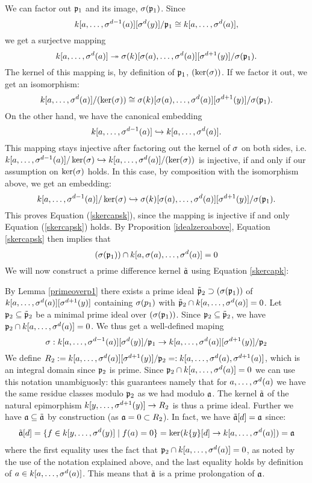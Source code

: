 \begin{prop}
\begin{bew}
We can factor out $\mathfrak{p}_1$ and its image, $\sigma(\mathfrak{p}_1)$. Since $$k[a,\ldots,\sigma^{d-1}(a)][\sigma^d(y)] / \mathfrak{p}_1 \cong k[a,\ldots, \sigma^d(a)],$$
we get a surjectve mapping $$k[a,\ldots, \sigma^d(a)] \twoheadrightarrow \sigma(k)[\sigma(a),\ldots,\sigma^d(a)][\sigma^{d+1}(y)]/\sigma(\mathfrak{p}_1).$$
The kernel of this mapping is, by definition of $\mathfrak{p}_1$, $(\ker(\sigma))$. If we factor it out, we get an isomorphism:
\[ k[a,\ldots, \sigma^d(a)]/(\operatorname{ker}(\sigma)) \cong \sigma(k)[\sigma(a),\ldots,\sigma^d(a)][\sigma^{d+1}(y)]/\sigma(\mathfrak{p}_1). \]
On the other hand, we have the canonical embedding $$k[a,\ldots,\sigma^{d-1}(a)] \hookrightarrow k[a,\ldots,\sigma^{d}(a)].$$
This mapping stays injective after factoring out the kernel of $\sigma$ on both sides, 
i.e. $k[a,\ldots,\sigma^{d-1}(a)]/\operatorname{ker}(\sigma) \hookrightarrow k[a,\ldots,\sigma^{d}(a)]/(\operatorname{ker}(\sigma))$ is injective, if and only if our assumption on $\ker(\sigma)$ holds.
In this case, by composition with the isomorphism above, we get an embedding:
\[ k[a,\ldots,\sigma^{d-1}(a)]/\operatorname{ker}(\sigma) \hookrightarrow \sigma(k)[\sigma(a),\ldots,\sigma^d(a)][\sigma^{d+1}(y)]/\sigma(\mathfrak{p}_1). \]
This proves Equation (\ref{skercapsk}), since the mapping is injective if and only Equation (\ref{skercapsk}) holds.
By Proposition \ref{idealzeroabove}, Equation \ref{skercapsk} then implies that
\begin{equation}\label{skercapk}
(\sigma(\mathfrak{p}_1)) \cap k[a,\sigma(a),\ldots,\sigma^d(a)]
 = 0
\end{equation}
We will now construct a prime difference kernel $\tilde {\mathfrak{a}}$ using Equation \ref{skercapk}:

By Lemma \ref{primeoverp1} there exists a prime ideal $\tilde {\mathfrak{p}}_2 \supset (\sigma(\mathfrak{p}_1))$ of $k[a,\ldots,\sigma^d(a)][\sigma^{d+1}(y)]$ containing $\sigma(p_1)$ with $\tilde {\mathfrak{p}}_2 \cap k[a,\ldots,\sigma^d(a)] = 0$. 
Let $\mathfrak{p}_2 \subseteq \tilde {\mathfrak{p}}_2$ be a minimal prime ideal over $(\sigma(\mathfrak{p}_1))$. Since $\mathfrak{p}_2 \subseteq \tilde {\mathfrak{p}}_2$, we have $\mathfrak{p}_2 \cap k[a,\ldots,\sigma^d(a)] = 0$.
We thus get a well-defined maping
\[ \sigma: k[a,\ldots,\sigma^{d-1}(a)][\sigma^d(y)]/\mathfrak{p}_1 \rightarrow k[a,\ldots, \sigma^d(a)][\sigma^{d+1}(y)]/\mathfrak{p}_2 \]
We define $R_2:= k[a,\ldots,\sigma^d(a)][\sigma^{d+1}(y)]/\mathfrak{p}_2 =: k[a,\ldots,\sigma^d(a),\sigma^{d+1}(a)]$, which is an integral domain since $\mathfrak{p}_2$ is prime. Since $\mathfrak{p}_2 \cap k[a,\ldots,\sigma^d(a)] = 0$ we can use this notation unambiguosly:
this guarantees namely that for $a, \ldots, \sigma^d(a)$ we have the same residue classes modulo $\mathfrak{p}_2$ as we had modulo $\mathfrak{a}$.
The kernel $\tilde {\mathfrak{a}}$ of the natural epimorphism $k[y,\ldots,\sigma^{d+1}(y)] \rightarrow R_2$ is thus a prime ideal.
Further we have $\mathfrak{a} \subseteq \tilde {\mathfrak{a}}$ by construction (as $\mathfrak{a} = 0 \subset R_2$). In fact, we have $\tilde {\mathfrak{a}}[d] = \mathfrak{a}$ since: 
\begin{align*}
\tilde {\mathfrak{a}}[d] = \{ f \in k[y,\ldots,\sigma^d(y)] \mid f(a) = 0 \} = \ker( k\{y\}[d] \rightarrow k[a,\ldots,\sigma^{d}(a)]) = \mathfrak{a}
\end{align*}
where the first equality uses the fact that $\mathfrak{p}_2 \cap k[a,\ldots,\sigma^d(a)] = 0$, as noted by the use of the notation explained above, and the last equality holds by definition of $a \in k[a,\ldots,\sigma^d(a)]$. This means that $\tilde {\mathfrak{a}}$ is a prime prolongation of $\mathfrak{a}$. 
\end{bew}
\end{prop}

